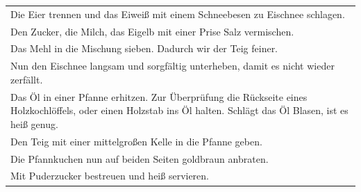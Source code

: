 \begin{tabular}{p{15cm}}
	\\
	Die Eier trennen und das Eiweiß mit einem Schneebesen zu Eischnee schlagen.\\
	Den Zucker, die Milch, das Eigelb mit einer Prise Salz vermischen.\\
	Das Mehl in die Mischung sieben. Dadurch wir der Teig feiner.\\
	Nun den Eischnee langsam und sorgfältig unterheben, damit es nicht wieder zerfällt.\\
	Das Öl in einer Pfanne erhitzen. Zur Überprüfung die Rückseite eines Holzkochlöffels, oder einen Holzstab ins Öl halten. Schlägt das Öl Blasen, ist es heiß genug.\\
	Den Teig mit einer mittelgroßen Kelle in die Pfanne geben.\\
	Die Pfannkuchen nun auf beiden Seiten goldbraun anbraten.\\
	Mit Puderzucker bestreuen und heiß servieren.
\end{tabular}

